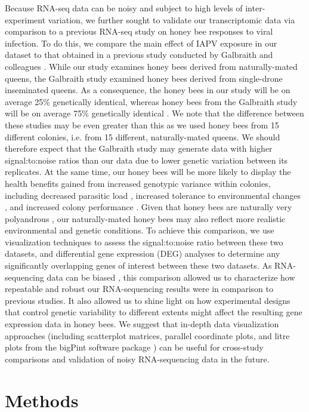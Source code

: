 \documentclass{bmcart}
\begin{document}
\begin{linenumbers}
\begin{doublespacing}
Because RNA-seq data can be noisy and subject to high levels of inter-experiment variation, we further sought to validate our transcriptomic data via comparison to a previous RNA-seq study on honey bee responses to viral infection. To do this, we compare the main effect of IAPV exposure in our dataset to that obtained in a previous study conducted by Galbraith and colleagues \cite{galbraith}. While our study examines honey bees derived from naturally-mated queens, the Galbraith study examined honey bees derived from single-drone inseminated queens. As a consequence, the honey bees in our study will be on average 25\% genetically identical, whereas honey bees from the Galbraith study will be on average 75\% genetically identical \cite{sisters}. We note that the difference between these studies may be even greater than this as we used honey bees from 15 different colonies, i.e. from 15 different, naturally-mated queens. We should therefore expect that the Galbraith study may generate data with higher signal:to:noise ratios than our data due to lower genetic variation between its replicates. At the same time, our honey bees will be more likely to display the health benefits gained from increased genotypic variance within colonies, including decreased parasitic load \cite{multParasite}, increased tolerance to environmental changes \cite{divHyp2}, and increased colony performance \cite{geneticDiverse, geneticDiverse2}. Given that honey bees are naturally very polyandrous \cite{patriline}, our naturally-mated honey bees may also reflect more realistic environmental and genetic conditions. To achieve this comparison, we use visualization techniques to assess the signal:to:noise ratio between these two datasets, and differential gene expression (DEG) analyses to determine any significantly overlapping genes of interest between these two datasets. As RNA-sequencing data can be biased \cite{biased1, biased2, biased3}, this comparison allowed us to characterize how repeatable and robust our RNA-sequencing results were in comparison to previous studies. It also allowed us to shine light on how experimental designs that control genetic variability to different extents might affect the resulting gene expression data in honey bees. We suggest that in-depth data visualization approaches (including scatterplot matrices, parallel coordinate plots, and litre plots from the bigPint software package \cite{bigpint}) can be useful for cross-study comparisons and validation of noisy RNA-sequencing data in the future.

\section*{Methods}


\end{doublespacing}
\end{linenumbers}
\end{document}
